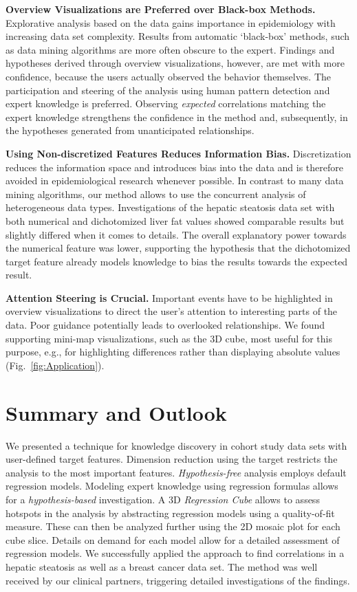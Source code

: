 \documentclass[journal]{style/vgtc} 			          %
\begin{document}
\textbf{Overview Visualizations are Preferred over Black-box Methods.}
Explorative analysis based on the data gains importance in epidemiology with increasing data set complexity.
Results from automatic `black-box' methods, such as data mining algorithms are more often obscure to the expert.
Findings and hypotheses derived through overview visualizations, however, are met with more confidence, because the users actually observed the behavior themselves.
The participation and steering of the analysis using human pattern detection and expert knowledge is preferred.
Observing \emph{expected} correlations matching the expert knowledge strengthens the confidence in the method and, subsequently, in the hypotheses generated from unanticipated relationships.

\textbf{Using Non-discretized Features Reduces Information Bias.}
Discretization reduces the information space and introduces bias into the data and is therefore avoided in epidemiological research whenever possible.
In contrast to many data mining algorithms, our method allows to use the concurrent analysis of heterogeneous data types.
Investigations of the hepatic steatosis data set with both numerical and dichotomized liver fat values showed comparable results but slightly differed when it comes to details.
The overall explanatory power towards the numerical feature was lower, supporting the hypothesis that the dichotomized target feature already models knowledge to bias the results towards the expected result.

\textbf{Attention Steering is Crucial.}
Important events have to be highlighted in overview visualizations to direct the user's attention to interesting parts of the data.
Poor guidance potentially leads to overlooked relationships.
We found supporting mini-map visualizations, such as the 3D cube, most useful for this purpose, e.g., for highlighting differences rather than displaying absolute values (Fig.~\ref{fig:Application}).
\section{Summary and Outlook}
We presented a technique for knowledge discovery in cohort study data sets with user-defined target features.
Dimension reduction using the target restricts the analysis to the most important features.
\emph{Hypothesis-free} analysis employs default regression models.
Modeling expert knowledge using regression formulas allows for a \emph{hypothesis-based} investigation.
A 3D \emph{Regression Cube} allows to assess hotspots in the analysis by abstracting regression models using a quality-of-fit measure.
These can then be analyzed further using the 2D mosaic plot for each cube slice.
Details on demand for each model allow for a detailed assessment of regression models.
We successfully applied the approach to find correlations in a hepatic steatosis as well as a breast cancer data set.
The method was well received by our clinical partners, triggering detailed investigations of the findings.
\end{document}
